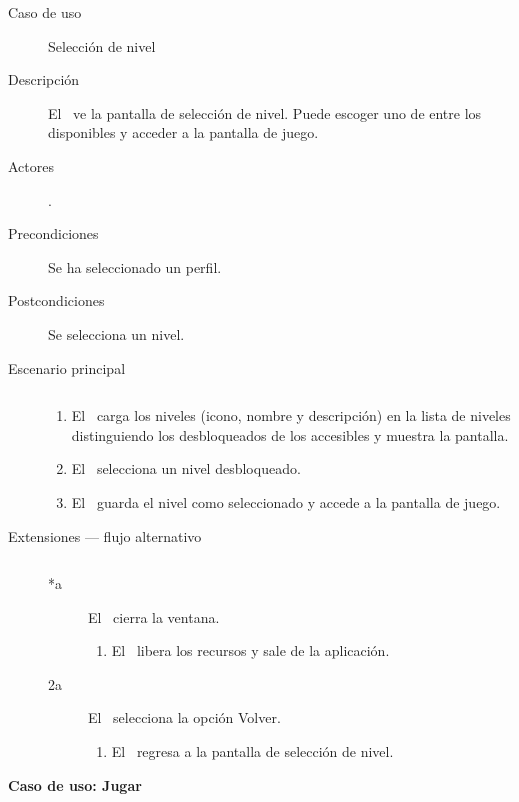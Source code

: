 \begin{description}
    \item [Caso de uso] Selección de nivel
    \item [Descripción] El \jugador\ ve la pantalla de selección de nivel.
    Puede escoger uno de entre los disponibles y acceder a la pantalla de
    juego.
    \item [Actores] \jugador.
    \item [Precondiciones] Se ha seleccionado un perfil.
    \item [Postcondiciones] Se selecciona un nivel.
    \item [Escenario principal] $\quad$
        \begin{enumerate}
            \item El \sistema\ carga los niveles (icono, nombre y descripción)
            en la lista de niveles distinguiendo los desbloqueados de los
            accesibles y muestra la pantalla. 
            \item El \jugador\ selecciona un nivel desbloqueado.
            \item El \sistema\ guarda el nivel como seleccionado y accede
            a la pantalla de juego.
        \end{enumerate}
    \item[Extensiones --- flujo alternativo] $\quad$
        \begin{description}
            \item [*a] El \jugador\ cierra la ventana.
                \begin{enumerate}
                    \item El \sistema\ libera los recursos y sale de la aplicación.
                \end{enumerate}
            \item [2a] El \jugador\ selecciona la opción Volver.
                \begin{enumerate}
                    \item El \sistema\ regresa a la pantalla de selección
                    de nivel.\\
                \end{enumerate}
        \end{description}
    
\end{description}


\textbf{Caso de uso: Jugar}

